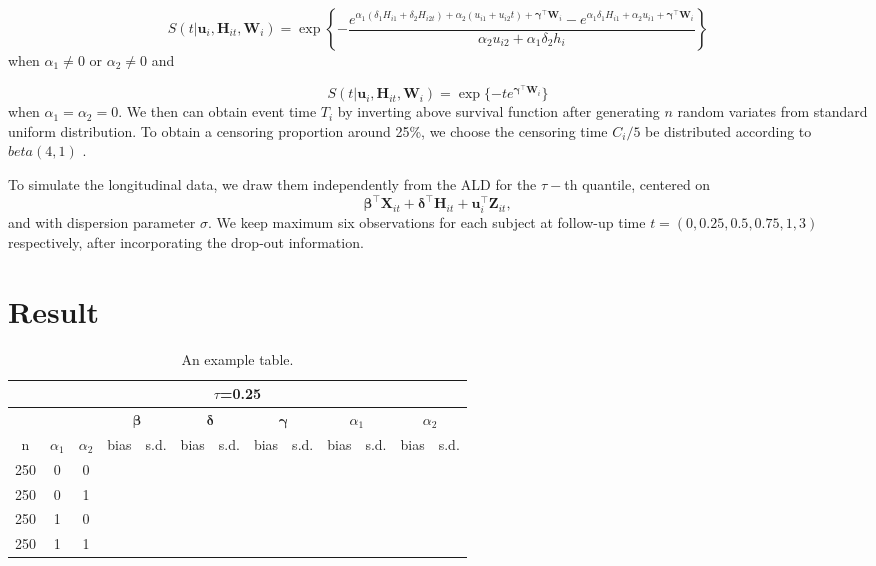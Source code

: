\[S(t|\boldsymbol{u}_i, {\boldsymbol H}_{it}, {\boldsymbol W}_i)=\exp\left\{-\frac{e^{\alpha_1(\delta_1H_{i1}+\delta_2H_{i2t}) + \alpha_2(u_{i1}+u_{i2}t) + \boldsymbol{\gamma}^{\top}\boldsymbol{W}_i} - e^{\alpha_1\delta_1H_{i1}+\alpha_2u_{i1} + \boldsymbol{\gamma}^{\top}\boldsymbol{W}_i}}{\alpha_2u_{i2}+\alpha_1\delta_2h_i}\right\}\] when $\alpha_1\ne0$ or $\alpha_2\ne0$ and 

\[S(t|\boldsymbol{u}_i, {\boldsymbol H}_{it}, {\boldsymbol W}_i) =  \exp\{-te^{\boldsymbol{\gamma}^{\top}\boldsymbol{W}_i}\}\]
when $\alpha_1=\alpha_2=0.$ We then can obtain event time $T_i$ by inverting above survival function after generating $n$ random variates from standard uniform distribution. To obtain a censoring proportion around 25\%, we choose the censoring time $C_i/5$ be distributed according to $beta(4,1)$ . \par

To simulate the longitudinal data, we draw them independently from the ALD for the $\tau-$th quantile, centered on 
\[\boldsymbol{\beta}^{\top}{\boldsymbol X}_{it} + \boldsymbol{\delta}^{\top}{\boldsymbol H}_{it} + {\boldsymbol u}_i^{\top}{\boldsymbol Z}_{it},\] and with dispersion parameter $\sigma$. We keep maximum six observations for each subject at follow-up time $t=(0, 0.25, 0.5, 0.75, 1, 3)$ respectively, after incorporating the drop-out information.




\section{Result}
\begin{table}[H]
\centering
\begin{tabular}{ccccccccccccc}
\hline
\multicolumn{13}{c}{$\tau$=0.25}\\
\hline
&&&\multicolumn{2}{c}{$\boldsymbol{\beta}$}&\multicolumn{2}{c}{$\boldsymbol{\delta}$}&\multicolumn{2}{c}{$\boldsymbol{\gamma}$}&\multicolumn{2}{c}{$\alpha_1$}&\multicolumn{2}{c}{$\alpha_2$}\\
n & $\alpha_1$ & $\alpha_2$ & bias & s.d. & bias & s.d. & bias & s.d. & bias & s.d. & bias & s.d. \\
250 & 0 & 0 & & & & & & & & & &\\
250 & 0 & 1 & & & & & & & & & &\\
250 & 1 & 0 & & & & & & & & & &\\
250 & 1 & 1 & & & & & & & & & &\\
\hline
\end{tabular}
\caption{\label{tab:widgets}An example table.}
\end{table}







